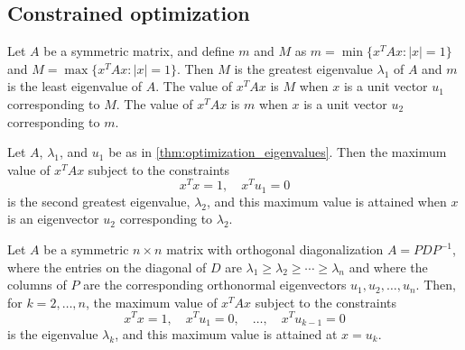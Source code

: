 \documentclass{article}
\begin{document}
\subsection{Constrained optimization}

\begin{thm}\label{thm:optimization_eigenvalues}
    Let \(A\) be a symmetric matrix, and define \(m\) and \(M\) as \(m=\min\{x^TAx:|x|=1\}\) and \(M=\max\{x^TAx:|x|=1\}\). Then \(M\) is the greatest eigenvalue \(\lambda_1\) of \(A\) and \(m\) is the least eigenvalue of \(A\). The value of \(x^TAx\) is \(M\) when \(x\) is a unit vector \(u_1\) corresponding to \(M\). The value of \(x^TAx\) is \(m\) when \(x\) is a unit vector \(u_2\) corresponding to \(m\).
\end{thm}

\begin{thm}
    Let \(A\), \(\lambda_1\), and \(u_1\) be as in \eqref{thm:optimization_eigenvalues}. Then the maximum value of \(x^TAx\) subject to the constraints \[x^Tx=1,\quad x^Tu_1=0\] is the second greatest eigenvalue, \(\lambda_2\), and this maximum value is attained when \(x\) is an eigenvector \(u_2\) corresponding to \(\lambda_2\).
\end{thm}

\begin{thm}
    Let \(A\) be a symmetric \(n \times n\) matrix with orthogonal diagonalization \(A = PDP^{-1}\), where the entries on the diagonal of \(D\) are \(\lambda_1 \geq \lambda_2 \geq \cdots \geq \lambda_n\) and where the columns of \(P\) are the corresponding orthonormal eigenvectors \(u_1, u_2, \ldots, u_n\). Then, for \(k = 2, \ldots, n\), the maximum value of \(x^T Ax\) subject to the constraints
    \[
    x^T x = 1, \quad x^T u_1 = 0, \quad \ldots, \quad x^T u_{k-1} = 0
    \]
    is the eigenvalue \(\lambda_k\), and this maximum value is attained at \(x = u_k\).
\end{thm}
\end{document}
